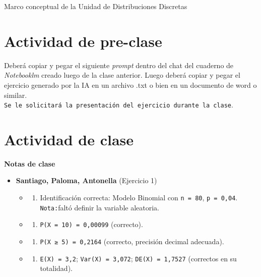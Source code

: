 \documentclass[
  spanish,
  letterpaper,
  DIV=11,
  numbers=noendperiod]{scrreprt}
\providecommand{\tightlist}{%
  \setlength{\itemsep}{0pt}\setlength{\parskip}{0pt}}
\begin{document}
Marco conceptual de la Unidad de Distribuciones Discretas

\section{\texorpdfstring{\textbf{Actividad de
pre-clase}}{Actividad de pre-clase}}\label{actividad-de-pre-clase}

Deberá copiar y pegar el siguiente \emph{prompt} dentro del chat del
cuaderno de \emph{Notebooklm} creado luego de la clase anterior. Luego
deberá copiar y pegar el ejercicio generado por la IA en un archivo .txt
o bien en un documento de word o similar.
\texttt{Se\ le\ solicitará\ la\ presentación\ del\ ejercicio\ durante\ la\ clase}.

\section{\texorpdfstring{\textbf{Actividad de
clase}}{Actividad de clase}}\label{actividad-de-clase}

\textbf{Notas de clase}

\begin{itemize}
\tightlist
\item
  \textbf{Santiago, Paloma, Antonella} (Ejercicio 1)

  \begin{itemize}
  \tightlist
  \item
    \begin{enumerate}
    \def\labelenumi{\alph{enumi})}
    \tightlist
    \item
      Identificación correcta: Modelo Binomial con \texttt{n\ =\ 80},
      \texttt{p\ =\ 0,04}. \texttt{Nota:}faltó definir la variable
      aleatoria.
    \end{enumerate}
  \item
    \begin{enumerate}
    \def\labelenumi{\alph{enumi})}
    \setcounter{enumi}{1}
    \tightlist
    \item
      \texttt{P(X\ =\ 10)\ =\ 0,00099} (correcto).
    \end{enumerate}
  \item
    \begin{enumerate}
    \def\labelenumi{\alph{enumi})}
    \setcounter{enumi}{2}
    \tightlist
    \item
      \texttt{P(X\ ≥\ 5)\ =\ 0,2164} (correcto, precisión decimal
      adecuada).
    \end{enumerate}
  \item
    \begin{enumerate}
    \def\labelenumi{\alph{enumi})}
    \setcounter{enumi}{3}
    \tightlist
    \item
      \texttt{E(X)\ =\ 3,2}; \texttt{Var(X)\ =\ 3,072};
      \texttt{DE(X)\ =\ 1,7527} (correctos en su totalidad).
    \end{enumerate}
  \end{itemize}
\end{itemize}
\end{document}
